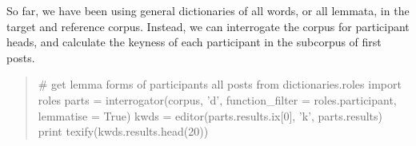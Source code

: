         So far, we have been using general dictionaries of all words, or all lemmata, in the target and reference corpus. Instead, we can interrogate the corpus for participant heads, and calculate the keyness of each participant in the subcorpus of first posts.

        \begin{quotation}
        \begin{singlespacing}
                \begin{pyverbatim}
                        # get lemma forms of participants all posts
                        from dictionaries.roles import roles
                        parts = interrogator(corpus, 'd', function_filter = roles.participant, 
                            lemmatise = True)
                        kwds = editor(parts.results.ix[0], 'k', parts.results)
                        print texify(kwds.results.head(20))
                \end{pyverbatim}
                \end{singlespacing}
        \end{quotation}

